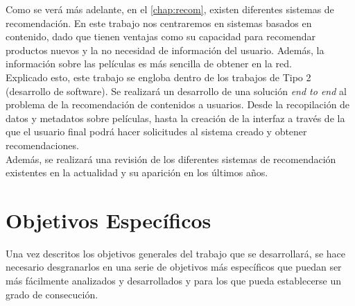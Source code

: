 Como se verá más adelante, en el \autoref{chap:recom}, existen diferentes sistemas de recomendación. En este trabajo nos centraremos en sistemas basados en contenido, dado que tienen ventajas como su capacidad para recomendar productos nuevos y la no necesidad de información del usuario. Además, la información sobre las películas es más sencilla de obtener en la red.\\

Explicado esto, este trabajo se engloba dentro de los trabajos de Tipo 2 (desarrollo de software). Se realizará un desarrollo de una solución \textit{end to end} al problema de la recomendación de contenidos a usuarios. Desde la recopilación de datos y metadatos sobre películas, hasta la creación de la interfaz a través de la que el usuario final podrá hacer solicitudes al sistema creado y obtener recomendaciones.\\

Además, se realizará una revisión de los diferentes sistemas de recomendación existentes en la actualidad y su aparición en los últimos años.\\



\section{Objetivos Específicos}\label{sec:objespecificos}

Una vez descritos los objetivos generales del trabajo que se desarrollará, se hace necesario desgranarlos en una serie de objetivos más específicos que puedan ser más fácilmente analizados y desarrollados y para los que pueda establecerse un grado de consecución.

